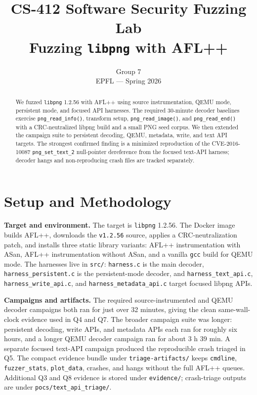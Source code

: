 \documentclass[letterpaper,twocolumn,10pt]{article}
\title{\Large CS-412 Software Security Fuzzing Lab\\Fuzzing \texttt{libpng} with AFL++}
\author{
Group 7\\
EPFL --- Spring 2026
}
\date{}
\begin{document}
\maketitle

\begin{abstract}
We fuzzed \texttt{libpng} 1.2.56 with AFL++ using source instrumentation,
QEMU mode, persistent mode, and focused API harnesses. The required 30-minute
decoder baselines exercise \texttt{png\_read\_info()}, transform setup,
\texttt{png\_read\_image()}, and \texttt{png\_read\_end()} with a
CRC-neutralized libpng build and a small PNG seed corpus. We then extended the
campaign suite to persistent decoding, QEMU, metadata, write, and text API
targets. The strongest confirmed finding is a minimized reproduction of the
CVE-2016-10087 \texttt{png\_set\_text\_2} null-pointer dereference from the
focused text-API harness; decoder hangs and non-reproducing crash files are
tracked separately.
\end{abstract}

\section{Setup and Methodology}
\textbf{Target and environment.}
The target is \texttt{libpng} 1.2.56. The Docker image builds AFL++, downloads
the \texttt{v1.2.56} source, applies a CRC-neutralization patch, and installs
three static library variants: AFL++ instrumentation with ASan, AFL++
instrumentation without ASan, and a vanilla \texttt{gcc} build for QEMU mode.
The harnesses live in \texttt{src/}: \texttt{harness.c} is the main decoder,
\texttt{harness\_persistent.c} is the persistent-mode decoder, and
\texttt{harness\_text\_api.c}, \texttt{harness\_write\_api.c}, and
\texttt{harness\_metadata\_api.c} target focused libpng APIs.

\textbf{Campaigns and artifacts.}
The required source-instrumented and QEMU decoder campaigns both ran for just
over 32 minutes, giving the clean same-wall-clock evidence used in Q4 and Q7.
The broader campaign suite was longer: persistent decoding, write APIs, and
metadata APIs each ran for roughly six hours, and a longer QEMU decoder campaign
ran for about 3 h 39 min. A separate focused text-API campaign produced the
reproducible crash triaged in Q5. The compact
evidence bundle under \texttt{triage-artifacts/} keeps
\texttt{cmdline}, \texttt{fuzzer\_stats}, \texttt{plot\_data}, crashes, and
hangs without the full AFL++ queues. Additional Q3 and Q8 evidence is stored
under \texttt{evidence/}; crash-triage outputs are under
\texttt{pocs/text\_api\_triage/}.
\end{document}
